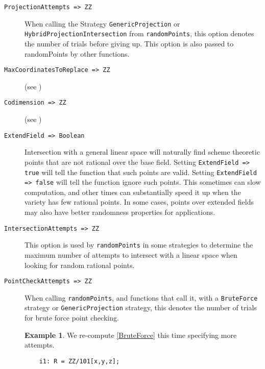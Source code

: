\documentclass[11pt]{amsart}
\theoremstyle{definition}
\newtheorem{example}{Example}[section]
\begin{document}
\begin{description}
	\item[\tt ProjectionAttempts => ZZ] 

	When calling the Strategy {\tt GenericProjection} or {\tt HybridProjectionIntersection} from {\tt randomPoints}, this option denotes the number of trials before giving up.  This option is also passed to randomPoints by other functions.

	\vspace{1em}
	\item[\tt MaxCoordinatesToReplace => ZZ] (see )
	\vspace{1em}
	\item[\tt Codimension => ZZ] (see )

	\vspace{1em}
	\item[\tt ExtendField => Boolean] 

	Intersection with a general linear space will naturally find scheme theoretic points that are not rational over the base field.  
	Setting {\tt ExtendField => true} will tell the function that such points are valid.  Setting {\tt ExtendField => false} will tell the function ignore such points.  This sometimes can slow computation, and other times can substantially speed it up when the variety has few rational points.  In some cases, points over extended fields may also have better randomness properties for applications.

	\vspace{1em}
	\item[\tt IntersectionAttempts => ZZ]

	This option is used by {\tt randomPoints} in some strategies to determine the maximum number of attempts to intersect with a linear space when looking for random rational points.  %

	\vspace{1em}
	\item[\tt PointCheckAttempts => ZZ]

	When calling {\tt randomPoints}, and functions that call it, with a {\tt BruteForce} strategy or {\tt GenericProjection} strategy, this denotes the number of trials for brute force point checking.
	
	\begin{example}
	We re-compute \cref{BruteForce} this time specifying more attempts.
		{{\small\color{blue}
		\begin{verbatim}
	i1: R = ZZ/101[x,y,z];


\end{verbatim}}}
\end{example}
\end{description}
\end{document}
